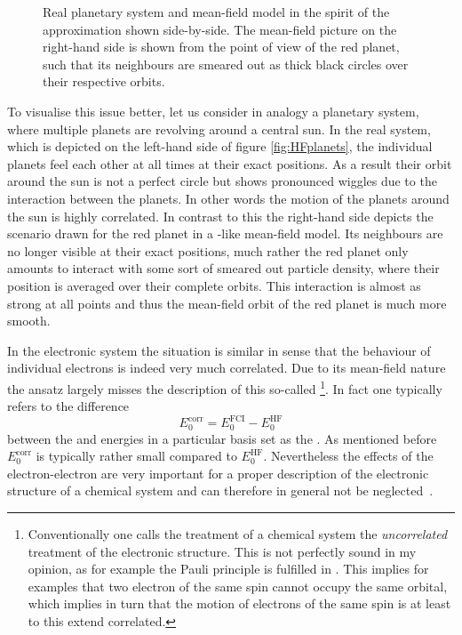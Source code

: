 \begin{figure}
	\centering
	\caption[Real planetary system and mean-field model of it shown side-by-side]{
		Real planetary system and mean-field model
		in the spirit of the \HF approximation
		shown side-by-side.
		The mean-field picture on the right-hand side
		is shown from the point of view of the red planet,
		such that its neighbours are smeared out as thick black
		circles over their respective orbits.
	}
	\label{fig:HFplanets}
\end{figure}
To visualise this issue better,
let us consider in analogy a planetary system,
where multiple planets are revolving around a central sun.
In the real system,
which is depicted on the left-hand side of figure \vref{fig:HFplanets},
the individual planets feel each other at all times
at their exact positions.
As a result their orbit around the sun is not a perfect circle but shows pronounced
wiggles due to the interaction between the planets.
In other words the motion of the planets around the sun is highly correlated.
In contrast to this the right-hand side
depicts the scenario drawn for the red planet in a \HF-like mean-field model.
Its neighbours are no longer visible at their exact positions,
much rather the red planet only amounts to interact with
some sort of smeared out particle density,
where their position is averaged over their complete orbits.
This interaction is almost as strong at all points
and thus the mean-field orbit of the red planet is much more smooth.

In the electronic system the situation is similar
in sense that the behaviour of individual electrons is indeed very much correlated.
Due to its mean-field nature the \HF ansatz
largely misses the description of this so-called %
\footnote{%
	Conventionally one calls the \HF treatment of a chemical system
	the \emph{uncorrelated} treatment of the electronic structure.
	This is not perfectly sound in my opinion,
	as for example the Pauli principle is fulfilled in \HF.
	This implies for examples that two electron of the same spin
	cannot occupy the same orbital,
	which implies in turn that the motion
	of electrons of the same spin is at least to this extend correlated.
}.
In fact one typically refers to the difference
\begin{equation}
	E_0^{\text{corr}} = E_0^{\text{FCI}} - E_0^{\text{HF}}
	\label{eqn:EnergyCorrelation}
\end{equation}
between the \HF and \FCI energies in a particular basis set
as the .
As mentioned before $E_0^{\text{corr}}$ is typically rather small
compared to $E_0^{\text{HF}}$.
Nevertheless the effects of the electron-electron are very important
for a proper description of the electronic structure of a chemical
system and can therefore in general not be neglected~\cite{Helgaker2013,Szabo1996,Jensen2007book}.

